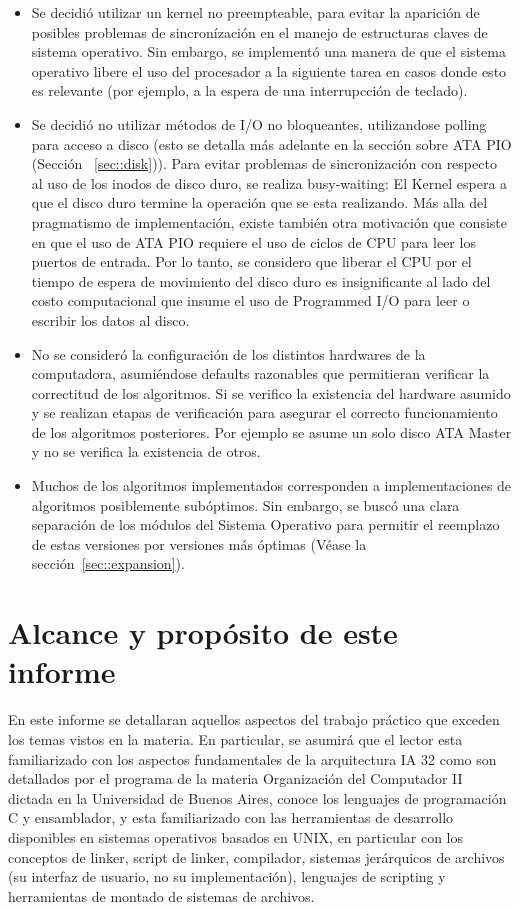 \begin{itemize}
	\item Se decidi\'o utilizar un kernel no preempteable, para evitar la aparici\'on de posibles problemas
	de sincron\'izaci\'on en el manejo de estructuras claves de sistema operativo. Sin embargo, se implement\'o
	una manera de que el sistema operativo libere el uso del procesador a la siguiente tarea en casos donde esto
	es relevante (por ejemplo, a la espera de una interrupcci\'on de teclado).
	\item Se decidi\'o no utilizar m\'etodos de I/O no bloqueantes, utilizandose polling para acceso a disco
	(esto se detalla m\'as adelante en la secci\'on sobre ATA PIO (Secci\'on ~\ref{sec::disk})). Para evitar problemas de sincronizaci\'on
	con respecto al uso de los inodos de disco duro, se realiza busy-waiting: El Kernel espera a que el disco duro termine
	la operaci\'on que se esta realizando. M\'as alla del pragmatismo de implementaci\'on, existe tambi\'en otra motivaci\'on
	que consiste en que el uso de ATA PIO requiere el uso de ciclos de CPU para leer los puertos de entrada. Por lo tanto, se considero
	que liberar el CPU por el tiempo de espera de movimiento del disco duro es insignificante al lado del costo computacional que insume
	el uso de Programmed I/O para leer o escribir los datos al disco.
	\item No se consider\'o la configuraci\'on de los distintos hardwares de la computadora, asumi\'endose defaults razonables que
	permitieran verificar la correctitud de los algoritmos. Si se verifico la existencia del hardware asumido y se realizan etapas de
	verificaci\'on para asegurar el correcto funcionamiento de los algoritmos posteriores. Por ejemplo se asume un solo disco ATA Master
	y no se verifica la existencia de otros.
	\item Muchos de los algoritmos implementados corresponden a implementaciones de algoritmos posiblemente sub\'optimos. Sin embargo, se
	busc\'o una clara separaci\'on de los m\'odulos del Sistema Operativo para permitir el reemplazo de estas versiones por versiones
	m\'as \'optimas (V\'ease la secci\'on~\ref{sec::expansion}).
\end{itemize}

\section{Alcance y prop\'osito de este informe}

En este informe se detallaran aquellos aspectos del trabajo pr\'actico que exceden los temas vistos en la materia. En particular,
se asumir\'a que el lector esta familiarizado con los aspectos fundamentales de la arquitectura IA 32 como son detallados por el programa de 
la materia Organizaci\'on del Computador II dictada en la Universidad de Buenos Aires, conoce los lenguajes de programaci\'on
C y ensamblador, y esta familiarizado con las herramientas de desarrollo disponibles en sistemas operativos basados en UNIX, en particular
con los conceptos de linker, script de linker, compilador, sistemas jer\'arquicos de archivos (su interfaz de usuario, no su implementaci\'on), 
lenguajes de scripting y herramientas de montado de sistemas de archivos.
